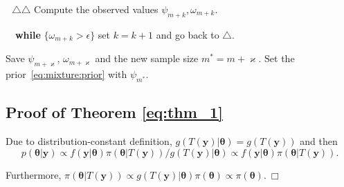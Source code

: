\documentclass{statsoc}
\begin{document}
\begin{small}
{{$\ \ \ \triangle\triangle$ Compute the observed values $\psi_{m+k}, \omega_{m+k}$.

$\ \ \ $ \textbf{while} $ \{\omega_{m+k} > \epsilon \}$ set  $k=k+1$ and go back to $\triangle$.

Save $\psi_{m+\varkappa}$, $\omega_{m+\varkappa}$ and the new sample size $m^{*}=m+\varkappa$.
Set the prior~\eqref{eq:mixture:prior} with $\psi_{m^{*}}$.
}}
   
\end{small}
   
   
\subsection*{Proof of Theorem \ref{eq:thm_1}}

Due to distribution-constant definition, $g( T( \bm{y})| \bm{\theta})= g( T( \bm{y}))$ and then $$p( \bm{\theta}| \bm{y}) \propto  f(\bm{y}|\bm{\theta}   )\pi(\bm{\theta}| T( \bm{y}))/ g( T( \bm{y})| \bm{\theta})  \propto f(\bm{y}|\bm{\theta}   )\pi(\bm{\theta}| T( \bm{y})).$$

Furthermore, $ \pi(\bm{\theta}| T( \bm{y})) \propto g( T( \bm{y})| \bm{\theta}) \pi(\bm{\theta}) \propto \pi(\bm{\theta}). \ \Box$
\end{document}
